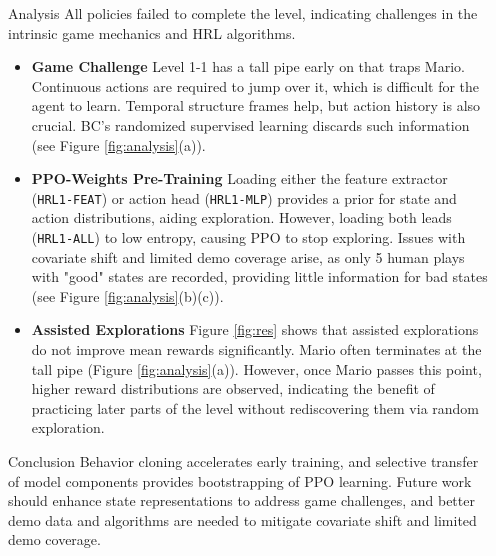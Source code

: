 \documentclass[final]{beamer}
\newlength{\sepwidth}
\newlength{\colwidth}
\newcommand{\separatorcolumn}{\begin{column}{\sepwidth}\end{column}}
\begin{document}
\begin{frame}[t]
\begin{columns}[t]
\begin{column}{\colwidth}
\begin{block}{Analysis}
    All policies failed to complete the level, indicating challenges in the 
    intrinsic game mechanics and HRL algorithms.

    \begin{itemize}
      \item \textbf{Game Challenge} Level 1-1 has a tall pipe early on that 
      traps Mario. Continuous actions are required to jump over it, which 
      is difficult for the agent to learn. Temporal structure frames help, 
      but action history is also crucial. BC's randomized supervised learning 
      discards such information (see Figure \ref{fig:analysis}(a)).

      \item \textbf{PPO-Weights Pre-Training} Loading either the feature 
      extractor (\texttt{HRL1-FEAT}) or action head (\texttt{HRL1-MLP}) 
      provides a prior for state and action distributions, aiding exploration. 
      However, loading both leads (\texttt{HRL1-ALL}) to low entropy, causing PPO to stop exploring. 
      Issues with covariate shift and limited demo coverage arise, as 
      only 5 human plays with "good" states are recorded, providing little 
      information for bad states (see Figure \ref{fig:analysis}(b)(c)).

      \item \textbf{Assisted Explorations} Figure \ref{fig:res} shows that 
      assisted explorations do not improve mean rewards significantly. Mario 
      often terminates at the tall pipe (Figure \ref{fig:analysis}(a)). However, 
      once Mario passes this point, higher reward distributions are observed, 
      indicating the benefit of practicing later parts of the level without 
      rediscovering them via random exploration.
    \end{itemize}
    
  \end{block}

  \begin{block}{Conclusion}
    Behavior cloning accelerates early training, and  
    selective transfer of model components provides bootstrapping of PPO learning.  
    Future work should enhance state representations to address game challenges,
    and better demo data and algorithms are needed to mitigate covariate shift  
    and limited demo coverage.
  \end{block}

  
  


\end{column}

\separatorcolumn
\end{columns}
\end{frame}
\end{document}
